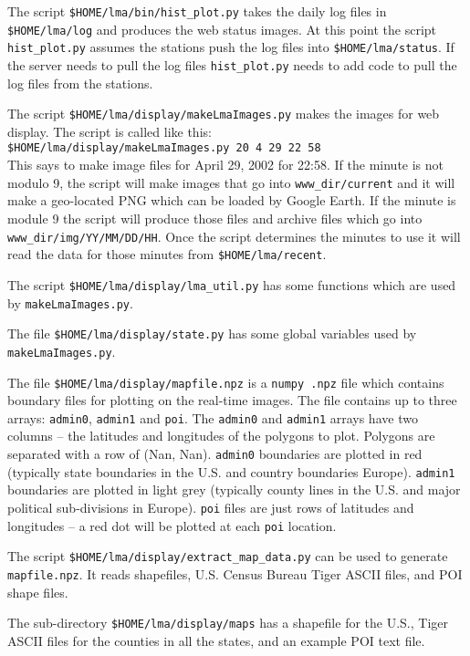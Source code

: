 \documentclass[12pt]{article}
\begin{document}
The script {\tt \$HOME/lma/bin/hist\_plot.py} takes the daily log files in 
{\tt \$HOME/lma/log} and produces the web status images.  At this point
the script {\tt hist\_plot.py} assumes the stations push the log files into 
{\tt \$HOME/lma/status}.  If the server needs to pull the log files {\tt hist\_plot.py}
needs to add code to pull the log files from the stations.

The script {\tt \$HOME/lma/display/makeLmaImages.py} makes the images for web display.  The script is called like this:\\
\verb+$HOME/lma/display/makeLmaImages.py 20 4 29 22 58+\\
This says to make image files for April 29, 2002 for 22:58.  If the minute is not modulo 9, the script will make images that go into 
\verb+www_dir/current+ and it will make a geo-located PNG which can be loaded by Google Earth.  If the minute is module 9 the script will
produce those files and archive files which go into \verb+www_dir/img/YY/MM/DD/HH+.  Once the script determines the minutes to use it will
read the data for those minutes from \verb+$HOME/lma/recent+.

The script {\tt \$HOME/lma/display/lma\_util.py} has some functions which are used by \verb+makeLmaImages.py+.

The file {\tt \$HOME/lma/display/state.py} has some global variables used by \verb+makeLmaImages.py+.

The file \verb+$HOME/lma/display/mapfile.npz+ is a \verb+numpy .npz+ file which contains boundary files for plotting on the real-time images.
The file contains up to three arrays:  \verb+admin0+, \verb+admin1+ and \verb+poi+.  The  \verb+admin0+ and \verb+admin1+ arrays have two
columns -- the latitudes and longitudes of the polygons to plot.  Polygons are separated with a row of (Nan, Nan).  \verb+admin0+ boundaries
are plotted in red (typically state boundaries in the U.S. and country boundaries Europe).  \verb+admin1+ boundaries are plotted in light grey
(typically county lines in the U.S. and major political sub-divisions in Europe).  \verb+poi+ files are just rows of latitudes and longitudes
-- a red dot will be plotted at each \verb+poi+ location.

The script \verb+$HOME/lma/display/extract_map_data.py+ can be used to generate \verb+mapfile.npz+. It reads shapefiles, U.S. Census Bureau Tiger ASCII files,
and POI shape files.  

The sub-directory \verb+$HOME/lma/display/maps+ has a shapefile for the U.S., Tiger ASCII files for the counties in all the states, and an
example POI text file.
\end{document}
